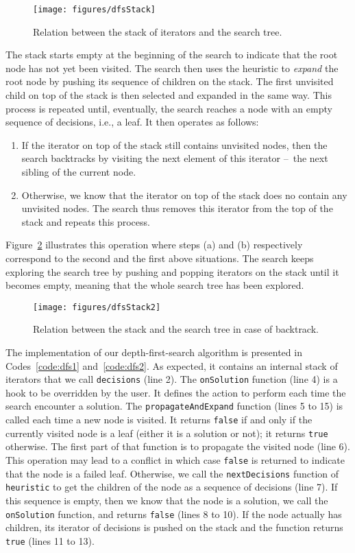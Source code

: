 \documentclass{llncs}
\newcommand{\fig}[1]{Figure~\ref{fig:#1}}
\begin{document}
\begin{figure}
    \centering
    \texttt{[image: figures/dfsStack]}
    \caption{Relation between the stack of iterators and the search tree.}
    \label{fig:dfsStack}
\end{figure}

The stack starts empty at the beginning of the search to indicate that the root node has not yet been visited. 
The search then uses the heuristic to \emph{expand} the root node by pushing its sequence of children on the stack. 
The first unvisited child on top of the stack is then selected and expanded in the same way. 
%
This process is repeated until, eventually, the search reaches a node with an empty sequence of decisions, i.e., a leaf. 
It then operates as follows:
%
\begin{enumerate}
	\item If the iterator on top of the stack still contains unvisited nodes, then the search backtracks by visiting the next element of this iterator --~the next sibling of the current node. 
	\item Otherwise, we know that the iterator on top of the stack does no contain any unvisited nodes. The search thus removes this iterator from the top of the stack and repeats this process.
\end{enumerate}
%
\fig{dfsStack2} illustrates this operation where steps (a) and (b) respectively correspond to the second and the first above situations. 
The search keeps exploring the search tree by pushing and popping iterators on the stack until it becomes empty, meaning that the whole search tree has been explored. 

\begin{figure}
    \centering
    \texttt{[image: figures/dfsStack2]}
    \caption{Relation between the stack and the search tree in case of backtrack.}
    \label{fig:dfsStack2}
\end{figure}

The implementation of our depth-first-search algorithm is presented in Codes~\ref{code:dfs1} and~\ref{code:dfs2}.
As expected, it contains an internal stack of iterators that we call \texttt{decisions} (line 2). 
The \texttt{onSolution} function (line 4) is a hook to be overridden by the user. 
It defines the action to perform each time the search encounter a solution. 
The \texttt{propagateAndExpand} function (lines 5 to 15) is called each time a new node is visited. It returns \texttt{false} if and only if the currently visited node is a leaf (either it is a solution or not); it returns \texttt{true} otherwise.
The first part of that function is to propagate the visited node (line 6). 
This operation may lead to a conflict in which case \texttt{false} is returned to indicate that the node is a failed leaf. 
Otherwise, we call the \texttt{nextDecisions} function of \texttt{heuristic} to get the children of the node as a sequence of decisions (line 7). 
If this sequence is empty, then we know that the node is a solution, we call the \texttt{onSolution} function, and returns \texttt{false} (lines 8 to 10). 
If the node actually has children, its iterator of decisions is pushed on the stack and the function returns \texttt{true} (lines 11 to 13).
\end{document}
